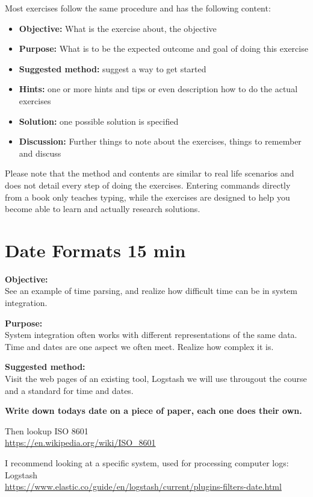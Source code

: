 \documentclass[a4paper,11pt,notitlepage]{report}
\begin{document}
Most exercises follow the same procedure and has the following content:
\begin{itemize}
\item {\bf Objective:} What is the exercise about, the objective
\item {\bf Purpose:} What is to be the expected outcome and goal of doing this exercise
\item {\bf Suggested method:} suggest a way to get started
\item {\bf Hints:} one or more hints and tips or even description how to
do the actual exercises
\item {\bf Solution:} one possible solution is specified
\item {\bf Discussion:} Further things to note about the exercises, things to remember and discuss
\end{itemize}

Please note that the method and contents are similar to real life scenarios and does not detail every step of doing the exercises. Entering commands directly from a book only teaches typing, while the exercises are designed to help you become able to learn and actually research solutions.


\chapter{Date Formats 15 min}
\label{ex:dateformats}


{\bf Objective:}\\
See an example of time parsing, and realize how difficult time can be in system integration.

{\bf Purpose:}\\
System integration often works with different representations of the same data. Time and dates are one aspect we often meet. Realize how complex it is.

{\bf Suggested method:}\\
Visit the web pages of an existing tool, Logstash we will use througout the course and a standard for time and dates.

{\bf Write down todays date on a piece of paper, each one does their own.}

Then lookup ISO 8601\\
\url{https://en.wikipedia.org/wiki/ISO_8601}

I recommend looking at a specific system, used for processing computer logs:
Logstash \\
\url{https://www.elastic.co/guide/en/logstash/current/plugins-filters-date.html}
\end{document}
